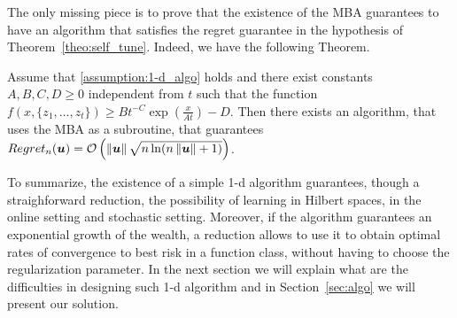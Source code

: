 The only missing piece is to prove that the existence of the \ac{MBA} guarantees to have an algorithm that satisfies the regret guarantee in the hypothesis of Theorem~\ref{theo:self_tune}. Indeed, we have the following Theorem.
\begin{theorem}
\label{theo:regret_pistol}
Assume that \ref{assumption:1-d_algo} holds and there exist constants $A,B,C,D\geq0$ independent from $t$ such that the function $f(x,\{z_1, \ldots, z_t\}) \geq B t^{-C} \exp(\frac{x}{A t})-D$.
Then there exists an algorithm, that uses the \ac{MBA} as a subroutine, that guarantees $Regret_n(\boldsymbol{u})=\mathcal{O}\left(\left\|{\boldsymbol{u}}\right\|\sqrt{n \ln(n \left\|{\boldsymbol{u}}\right\|+1)}\right)$.
\end{theorem}



To summarize, the existence of a simple 1-d algorithm guarantees, though a straighforward reduction, the possibility of learning in Hilbert spaces, in the online setting and stochastic setting. Moreover, if the algorithm guarantees an exponential growth of the wealth, a reduction allows to use it to obtain optimal rates of convergence to best risk in a function class, without having to choose the regularization parameter.
In the next section we will explain what are the difficulties in designing such 1-d algorithm and in Section~\ref{sec:algo} we will present our solution.